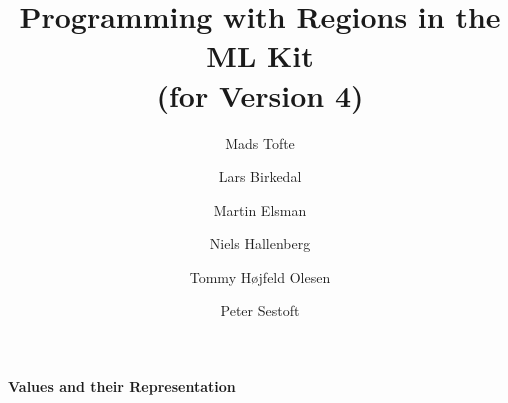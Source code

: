 \documentclass[12pt]{book}
\title{Programming with Regions in the ML Kit\\
(for Version 4)}
\author{Mads Tofte \and Lars Birkedal \and Martin Elsman \and
\and Niels Hallenberg \and Tommy H\o jfeld Olesen \and
Peter Sestoft}
\begin{document}











\maketitle

\pagestyle{headings}
\begin{center}
\bf Values and their Representation
\end{center}
\smallskip
\end{document}
